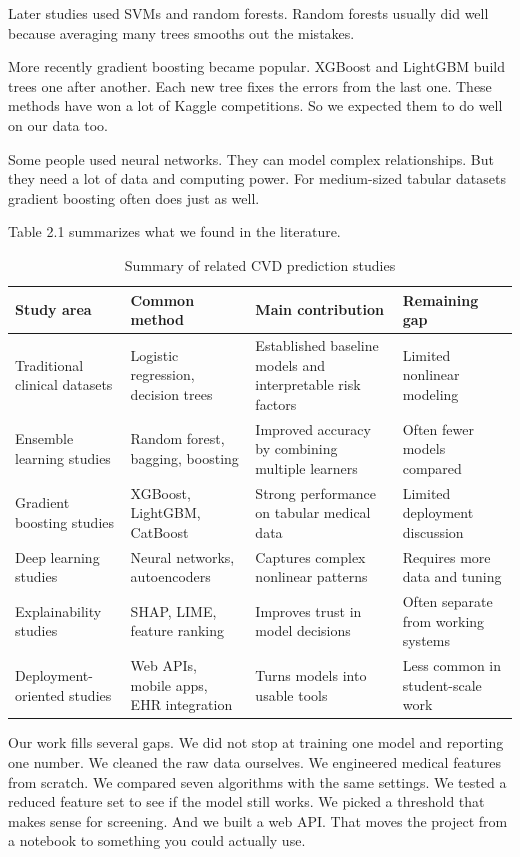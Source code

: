 \documentclass[12pt, a4paper, oneside]{book}
\begin{document}
Later studies used SVMs and random forests. Random forests usually did well because averaging many trees smooths out the mistakes.

More recently gradient boosting became popular. XGBoost and LightGBM build trees one after another. Each new tree fixes the errors from the last one. These methods have won a lot of Kaggle competitions. So we expected them to do well on our data too.

Some people used neural networks. They can model complex relationships. But they need a lot of data and computing power. For medium-sized tabular datasets gradient boosting often does just as well.

Table 2.1 summarizes what we found in the literature.

\begin{table}[H]
\centering
\caption{Summary of related CVD prediction studies}
\label{tab:related_work}
\small
{}
\renewcommand{\arraystretch}{1.15}
\begin{tabular}{p{} p{} p{} p{}}
\toprule
\textbf{Study area} & \textbf{Common method} & \textbf{Main contribution} & \textbf{Remaining gap} \\
\midrule
Traditional clinical datasets & Logistic regression, decision trees & Established baseline models and interpretable risk factors & Limited nonlinear modeling \\
Ensemble learning studies & Random forest, bagging, boosting & Improved accuracy by combining multiple learners & Often fewer models compared \\
Gradient boosting studies & XGBoost, LightGBM, CatBoost & Strong performance on tabular medical data & Limited deployment discussion \\
Deep learning studies & Neural networks, autoencoders & Captures complex nonlinear patterns & Requires more data and tuning \\
Explainability studies & SHAP, LIME, feature ranking & Improves trust in model decisions & Often separate from working systems \\
Deployment-oriented studies & Web APIs, mobile apps, EHR integration & Turns models into usable tools & Less common in student-scale work \\
\bottomrule
\end{tabular}
\end{table}

Our work fills several gaps. We did not stop at training one model and reporting one number. We cleaned the raw data ourselves. We engineered medical features from scratch. We compared seven algorithms with the same settings. We tested a reduced feature set to see if the model still works. We picked a threshold that makes sense for screening. And we built a web API. That moves the project from a notebook to something you could actually use.
\end{document}

